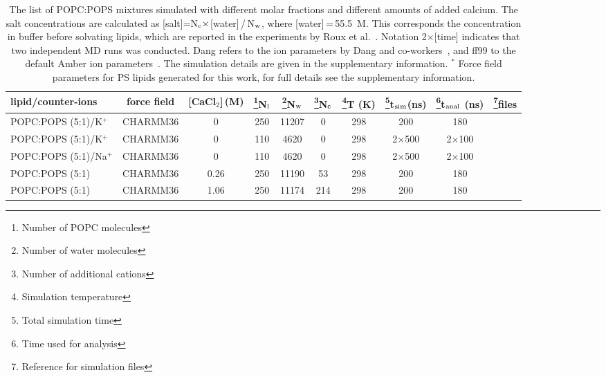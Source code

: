 \documentclass[aps,prl,superscriptaddress,twocolumn]{revtex4}
\begin{document}
\begin{table}[tb]
\centering
\caption{The list of POPC:POPS mixtures simulated with different molar fractions and different amounts of added calcium. 
  The salt concentrations are calculated as [salt]=N$_{\rm c} \times$[water]\,/\,N$_{\rm w}$, where [water]\,=\,55.5~M.
  This corresponds the concentration in buffer before solvating lipids, which are
  reported in the experiments by Roux et al.~\cite{roux90}.
  Notation 2$\times$[time] indicates that two independent MD runs was conducted.
  Dang refers to the ion parameters by Dang and co-workers~\cite{smith94,dang06}, and ff99 to the default Amber ion parameters~\cite{aqvist90}.
  The simulation details are given in the supplementary information.
  $^*$ Force field parameters for PS lipids generated for this work, for full details see the supplementary information.
}\label{mixedIONsystems}
\begin{tabular}{lccccccccc}
lipid/counter-ions  & force field & {[}CaCl$_{2}${]}\,(M)  & \footnote{Number of POPC molecules}N$_{{\rm l}}$  & \footnote{Number of water molecules}N$_{{\rm w}}$  & \footnote{Number of additional cations}N$_{{\rm c}}$  & \footnote{Simulation temperature}T (K)  & \footnote{Total simulation time}t$_{{\rm sim}}$(ns)  & \footnote{Time used for analysis}t$_{{\rm anal}}$ (ns)  & \footnote{Reference for simulation files}files\tabularnewline
\hline 
POPC:POPS (5:1)/K$^{+}$  & CHARMM36 \cite{klauda10,venable13}  & 0  & 250  & 11207  & 0  & 298  & 200  & 180  & \cite{POPC5POPS1noCaClCHARMM} \tabularnewline
POPC:POPS (5:1)/K$^{+}$  & CHARMM36 \cite{klauda10,venable13}  & 0  & 110  & 4620  & 0  & 298  & 2$\times$500  & 2$\times$100  & \cite{charmm36pops+83popcT298Kpiggot} \tabularnewline
POPC:POPS (5:1)/Na$^{+}$  & CHARMM36 \cite{klauda10,venable13}  & 0  & 110 & 4620  & 0  & 298  & 2$\times$500  & 2$\times$100  & \cite{charmm36pops+83popcT298KpiggotSODIUM} \tabularnewline
POPC:POPS (5:1)  & CHARMM36 \cite{klauda10,venable13,kim16}  & 0.26  & 250 & 11190  & 53  & 298  & 200  & 180  & \cite{POPC5POPS1withCaClCHARMM} \tabularnewline
POPC:POPS (5:1)  & CHARMM36 \cite{klauda10,venable13,kim16}  & 1.06  & 250 & 11174  & 214  & 298  & 200  & 180  & \cite{POPC5POPS1with1MCaClCHARMM} \tabularnewline

\end{tabular}
\end{table}
\end{document}
